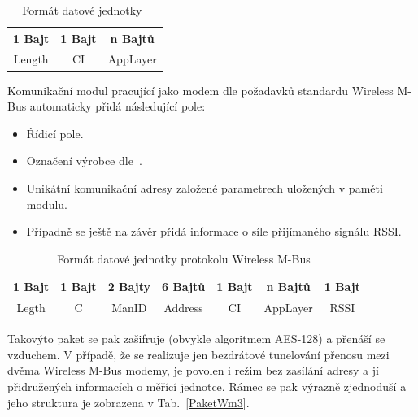 \begin{table}[!ht]
\vspace{-10pt}
\centering
\begin{tabular}{ccc}
1 Bajt & 1 Bajt & n Bajtů \\ \hline
\multicolumn{1}{|c|}{Length} & \multicolumn{1}{c|}{CI} & \multicolumn{1}{c|}{AppLayer} \\ \hline
\end{tabular}
\caption{Formát datové jednotky~\cite{FormatDatoveJednotky}}
\label{PaketWm1}
\vspace{-10pt}
\end{table}

Komunikační modul pracující jako modem dle požadavků standardu Wireless M-Bus automaticky přidá následující pole:

\begin{itemize}
	\item Řídicí pole.
\item Označení výrobce dle~\cite{WmbusVendors}.
\item Unikátní komunikační adresy založené parametrech uložených v paměti modulu.
\item Případně se ještě na závěr přidá informace o síle přijímaného signálu RSSI.
\end{itemize}



\begin{table}[!ht]
\centering
\begin{tabular}{ccccccc}
1 Bajt & 1 Bajt & 2 Bajty & 6 Bajtů & 1 Bajt & n Bajtů & 1 Bajt \\ \hline
\multicolumn{1}{|c|}{Legth} & \multicolumn{1}{c|}{C} & \multicolumn{1}{c|}{ManID} & \multicolumn{1}{c|}{Address} & \multicolumn{1}{c|}{CI} & \multicolumn{1}{c|}{AppLayer} & \multicolumn{1}{c|}{RSSI} \\ \hline
\end{tabular}
\caption{Formát datové jednotky protokolu Wireless M-Bus~\cite{FormatDatoveJednotky}}
\label{PaketWm2}
\vspace{-5pt}
\end{table}

Takovýto paket se pak zašifruje (obvykle algoritmem AES-128) a přenáší se vzduchem. V případě, že se realizuje jen bezdrátové tunelování přenosu mezi dvěma Wireless M-Bus modemy, je povolen i režim bez zasílání adresy a jí přidružených informacích o měřící jednotce. Rámec se pak výrazně zjednoduší a jeho struktura je zobrazena v Tab.~\ref{PaketWm3}.

